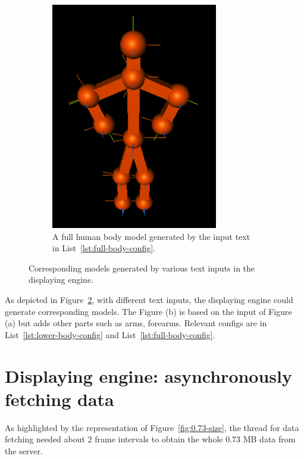 \begin{figure}[htbp]
\begin{subfigure}[b]{0.45\textwidth}
		\includegraphics[width=0.8\textwidth]{
			fileForWriting/full-body}
		\caption[The model generated by the input text for a full human body]{A full human body model generated by the input text in List~\ref{lst:full-body-config}.}
		\label{fig:full-body-model}
	\end{subfigure}
	\caption[]{Corresponding models generated by various text inputs in the displaying engine.}
	\label{fig:flexible-input}
\end{figure}

As depicted in Figure~\ref{fig:flexible-input}, with different text inputs, the displaying engine could generate corresponding models.
The Figure (b) is based on the input of Figure (a) but adds other parts such as arms, forearms.
Relevant configs are in List~\ref{lst:lower-body-config} and  List~\ref{lst:full-body-config}.




\section{Displaying engine: asynchronously fetching data}\label{sec:async}
As highlighted by the representation of Figure~\ref{fig:0.73-size}, the thread for data fetching needed about 2 frame intervals to obtain the whole 0.73 MB data from the server.

